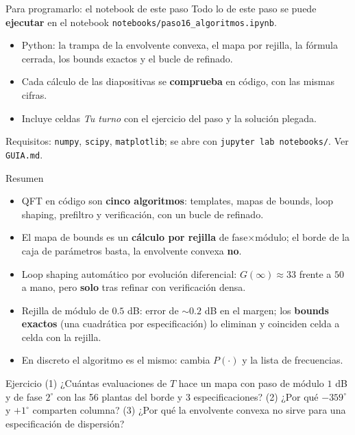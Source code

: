 \documentclass[aspectratio=169,11pt]{beamer}
\begin{document}
\begin{frame}{Para programarlo: el notebook de este paso}
  \small
  Todo lo de este paso se puede \textbf{ejecutar} en el notebook \texttt{notebooks/paso16\_algoritmos.ipynb}.
  \begin{itemize}
    \item Python: la trampa de la envolvente convexa, el mapa por rejilla, la fórmula cerrada, los bounds exactos y el bucle de refinado.
    \item Cada cálculo de las diapositivas se \textbf{comprueba} en código, con las mismas cifras.
    \item Incluye celdas \emph{Tu turno} con el ejercicio del paso y la solución plegada.
  \end{itemize}
  \footnotesize Requisitos: \texttt{numpy}, \texttt{scipy}, \texttt{matplotlib}; se abre con \texttt{jupyter lab notebooks/}. Ver \texttt{GUIA.md}.
\end{frame}

\begin{frame}{Resumen}
  \small
  \begin{itemize}
    \item QFT en código son \textbf{cinco algoritmos}: templates, mapas de bounds, loop shaping, prefiltro y verificación, con un bucle de refinado.
    \item El mapa de bounds es un \textbf{cálculo por rejilla} de fase$\times$módulo; el borde de la caja de parámetros basta, la envolvente convexa \textbf{no}.
    \item Loop shaping automático por evolución diferencial: $G(\infty)\approx33$ frente a $50$ a mano, pero \textbf{solo} tras refinar con verificación densa.
    \item Rejilla de módulo de $0.5$ dB: error de $\sim0.2$ dB en el margen; los \textbf{bounds exactos} (una cuadrática por especificación) lo eliminan y coinciden celda a celda con la rejilla.
    \item En discreto el algoritmo es el mismo: cambia $P(\cdot)$ y la lista de frecuencias.
  \end{itemize}
  \begin{block}{Ejercicio}
    (1) ¿Cuántas evaluaciones de $T$ hace un mapa con paso de módulo $1$ dB y de fase $2^\circ$ con las 56 plantas del borde y 3 especificaciones? (2) ¿Por qué $-359^\circ$ y $+1^\circ$ comparten columna? (3) ¿Por qué la envolvente convexa no sirve para una especificación de dispersión?
  \end{block}
\end{frame}
\end{document}
